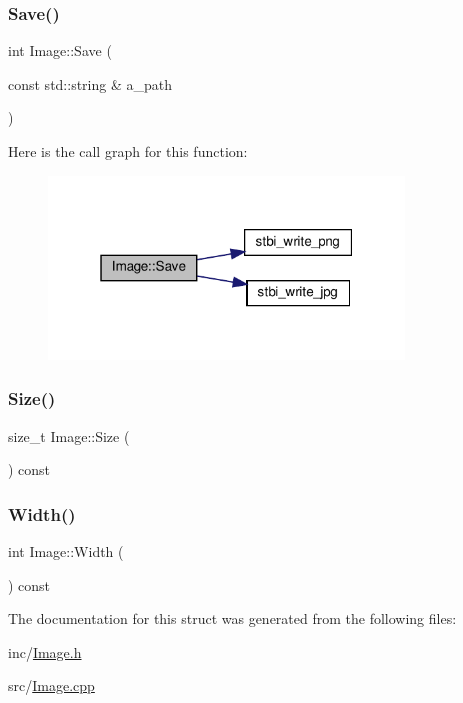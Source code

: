 \subsubsection{\texorpdfstring{Save()}{Save()}}
{\footnotesize\ttfamily int Image\+::\+Save (\begin{DoxyParamCaption}\item[{const std\+::string \&}]{a\+\_\+path }\end{DoxyParamCaption})}

Here is the call graph for this function\+:\nopagebreak
\begin{figure}[H]
\begin{center}
\leavevmode
\includegraphics[width=268pt]{structImage_a4cb69c5911f1f8e4944047825dcf117c_cgraph}
\end{center}
\end{figure}
\mbox{\label{structImage_a3690a0986d16c2f5f30e2625e645cc8e}} 
\subsubsection{\texorpdfstring{Size()}{Size()}}
{\footnotesize\ttfamily size\+\_\+t Image\+::\+Size (\begin{DoxyParamCaption}{ }\end{DoxyParamCaption}) const\hspace{0.3cm}{\ttfamily [inline]}}

\mbox{\label{structImage_a191889676e394b6eba27e994edb7e02d}} 
\subsubsection{\texorpdfstring{Width()}{Width()}}
{\footnotesize\ttfamily int Image\+::\+Width (\begin{DoxyParamCaption}{ }\end{DoxyParamCaption}) const\hspace{0.3cm}{\ttfamily [inline]}}



The documentation for this struct was generated from the following files\+:\begin{DoxyCompactItemize}
\item 
inc/\hyperlink{Image_8h}{Image.\+h}\item 
src/\hyperlink{Image_8cpp}{Image.\+cpp}\end{DoxyCompactItemize}

